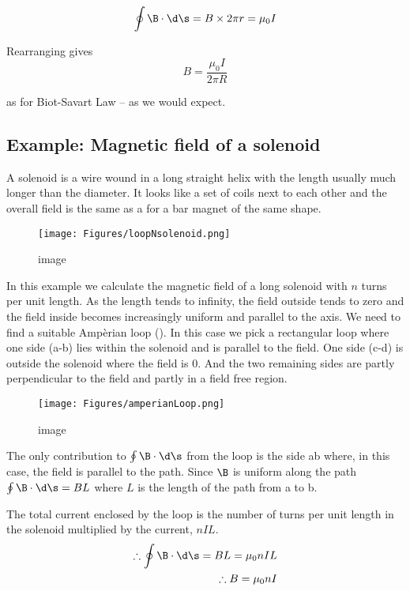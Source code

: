 \documentclass[
]{book}
\theoremstyle{definition}
\theoremstyle{definition}
\theoremstyle{definition}
\theoremstyle{definition}
\theoremstyle{remark}
\begin{document}
\[\begin{aligned}
\oint \B \cdot \d\s = B \times 2\pi r = \mu_0 I
\end{aligned}\]

Rearranging gives \[B = \frac{\mu_0 I}{2\pi R}\]

as for Biot-Savart Law -- as we would expect.

\hypertarget{example-magnetic-field-of-a-solenoid}{%
\subsection{Example: Magnetic field of a solenoid}\label{example-magnetic-field-of-a-solenoid}}

A solenoid is a wire wound in a long straight helix with the length
usually much longer than the diameter. It looks like a set of coils next
to each other and the overall field is the same as a for a bar magnet of
the same shape.

\begin{figure}
\centering
\texttt{[image: Figures/loopNsolenoid.png]}
\caption{image}
\end{figure}

In this example we calculate the magnetic field of a long solenoid with
\(n\) turns per unit length. As the length tends to infinity, the field
outside tends to zero and the field inside becomes increasingly uniform
and parallel to the axis. We need to find a suitable Ampèrian loop ().
In this case we pick a rectangular loop where one side (a-b) lies within
the solenoid and is parallel to the field. One side (c-d) is outside the
solenoid where the field is 0. And the two remaining sides are partly
perpendicular to the field and partly in a field free region.

\begin{figure}
\centering
\texttt{[image: Figures/amperianLoop.png]}
\caption{image}
\end{figure}

The only contribution to \(\oint \B \cdot \d\s\) from the loop is the side
ab where, in this case, the field is parallel to the path. Since \(\B\) is
uniform along the path \(\oint \B \cdot \d\s = BL\) where \(L\) is the
length of the path from a to b.

The total current enclosed by the loop is the number of turns per unit
length in the solenoid multiplied by the current, \(nIL\).
\[\begin{aligned}
\therefore \oint \B \cdot \d\s = BL = \mu_0 nIL \\
\therefore B = \mu_0 nI
\end{aligned}\]
\end{document}
